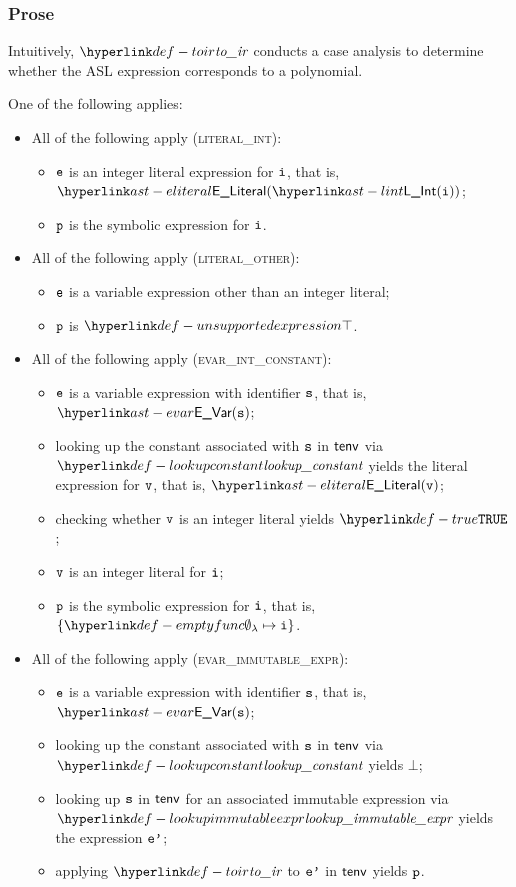 \subsubsection{Prose}
Intuitively, $\toir$ conducts a case analysis to determine whether the ASL expression corresponds to a polynomial.

One of the following applies:
\begin{itemize}
  \item All of the following apply (\textsc{literal\_int}):
  \begin{itemize}
    \item $\texttt{e}$ is an integer literal expression for $\texttt{i}$, that is, $\ELiteral(\lint(\vi))$;
    \item $\texttt{p}$ is the symbolic expression for $\texttt{i}$.
  \end{itemize}

  \item All of the following apply (\textsc{literal\_other}):
  \begin{itemize}
    \item $\texttt{e}$ is a variable expression other than an integer literal;
    \item $\texttt{p}$ is $\CannotBeTransformed$.
  \end{itemize}

  \item All of the following apply (\textsc{evar\_int\_constant}):
  \begin{itemize}
    \item $\texttt{e}$ is a variable expression with identifier $\texttt{s}$, that is, $\EVar(\vs)$;
    \item looking up the constant associated with $\texttt{s}$ in $\textsf{tenv}$ via $\lookupconstant$ yields the literal expression for $\texttt{v}$, that is, $\ELiteral(\vv)$;
    \item checking whether $\texttt{v}$ is an integer literal yields $\True$\ProseOrTypeError;
    \item $\texttt{v}$ is an integer literal for $\texttt{i}$;
    \item $\texttt{p}$ is the symbolic expression for $\texttt{i}$, that is, $\{ \emptyfunc\mapsto \vi \}$.
  \end{itemize}

  \item All of the following apply (\textsc{evar\_immutable\_expr}):
  \begin{itemize}
    \item $\texttt{e}$ is a variable expression with identifier $\texttt{s}$, that is, $\EVar(\vs)$;
    \item looking up the constant associated with $\texttt{s}$ in $\textsf{tenv}$ via $\lookupconstant$ yields $\bot$;
    \item looking up $\texttt{s}$ in $\textsf{tenv}$ for an associated immutable expression via \\
          $\lookupimmutableexpr$ yields the expression $\texttt{e'}$;
    \item applying $\toir$ to $\texttt{e'}$ in $\textsf{tenv}$ yields $\texttt{p}$.
  \end{itemize}


\end{itemize}

